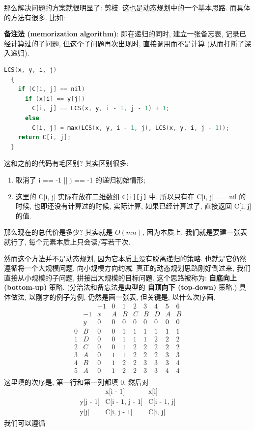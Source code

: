 \documentclass[a4paper]{ctexart}
\theoremstyle{definition}
\theoremstyle{definition}
\begin{document}
那么解决问题的方案就很明显了: 剪枝. 这也是动态规划中的一个基本思路. 
而具体的方法有很多. 比如:

\textbf{备注法 (memorization algorithm)}: 即在递归的同时, 
建立一张备忘表, 记录已经计算过的子问题, 但这个子问题再次出现时, 
直接调用而不是计算 (从而打断了深入递归). 

\begin{lstlisting}[language=c++]
  LCS(x, y, i, j)
  {
    if (C[i, j] == nil)
      if (x[i] == y[j])
        C[i, j] == LCS(x, y, i - 1, j - 1) + 1;   
      else
        C[i, j] = max(LCS(x, y, i - 1, j), LCS(x, y, i, j - 1));
    return C[i, j];
  }
\end{lstlisting}

这和之前的代码有毛区别? 其实区别很多:

\begin{enumerate}
  \item 取消了 i == -1 || j == -1 的递归初始情形;
  \item 这里的 C[i, j] 实际存放在二维数组 \verb|C[i][j]| 中. 
  所以只有在 C[i, j] == nil 的时候, 也即还没有计算过的时候, 
  实际计算, 如果已经计算过了, 直接返回 C[i, j] 的值.
\end{enumerate}

那么现在的总代价是多少? 其实就是 $O(mn)$, 
因为本质上, 我们就是要建一张表就行了, 每个元素本质上只会读/写若干次.

然而这个方法并不是动态规划, 因为它本质上没有脱离递归的策略. 
也就是它仍然遵循将一个大规模问题, 向小规模方向约减. 
真正的动态规划思路刚好倒过来, 我们直接从小规模的子问题, 
拼接出大规模的目标问题. 这个思路被称为: \textbf{自底向上 (bottom-up)} 策略.
(分治法和备忘法是典型的 \textbf{自顶向下 (top-down)} 策略.) 
具体做法, 以刚才的例子为例, 仍然是画一张表, 但关键是, 以什么次序画.
$$
\begin{array}{cccccccccc}
&&-1&0&1&2&3&4&5&6\\
&-1&x&A&B&C&B&D&A&B\\
&y&0&0&0&0&0&0&0&0\\
0&B&0&0&1&1&1&1&1&1\\
1&D&0&0&1&1&1&2&2&2\\
2&C&0&0&1&2&2&2&2&2\\
3&A&0&1&1&2&2&2&3&3\\
4&B&0&1&2&2&3&3&3&4\\
5&A&0&1&2&2&3&3&4&4\\
\end{array}
$$
这里填的次序是, 第一行和第一列都填 $0$, 然后对
$$
\begin{array}{ccc}
&\mbox{x[i - 1]} &\mbox{x[i]}\\
\mbox{y[j - 1]} & \mbox{C[i - 1, j - 1]} & \mbox{C[i - 1, j]}\\
\mbox{y[j]} &\mbox{C[i, j - 1]} &\mbox{C[i, j]} 
\end{array}
$$
我们可以遵循
\end{document}

